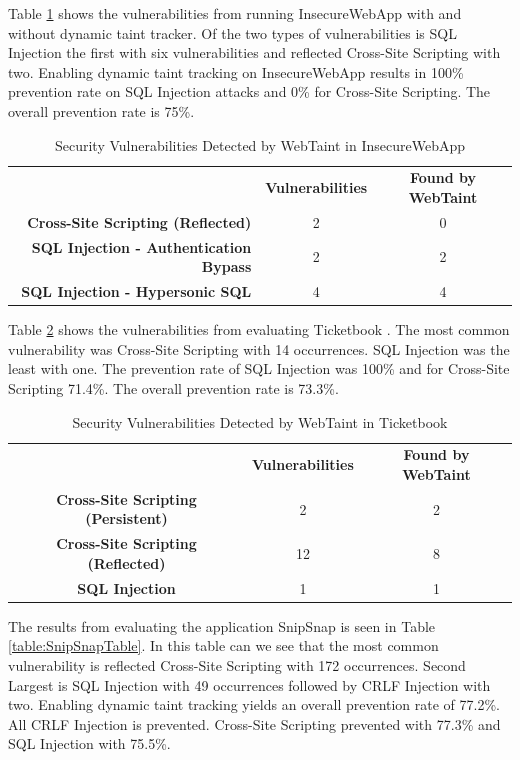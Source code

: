 Table \ref{table:InsecureTable} shows the vulnerabilities from running InsecureWebApp \parencite{insecure} with and without dynamic taint tracker. Of the two types of vulnerabilities is SQL Injection the first with six vulnerabilities and reflected Cross-Site Scripting with two. Enabling dynamic taint tracking on InsecureWebApp \parencite{insecure} results in 100\% prevention rate on SQL Injection attacks and 0\% for Cross-Site Scripting. The overall prevention rate is 75\%. 

\begin{table}[H]
  \centering
  \caption{Security Vulnerabilities Detected by WebTaint in InsecureWebApp}
  \label{table:InsecureTable}
    \begin{tabular}{rcc}
      & \textbf{Vulnerabilities} & \textbf{Found by WebTaint} \\
      \textbf{Cross-Site Scripting (Reflected)}      & 2             & 0  \\
      \textbf{SQL Injection - Authentication Bypass} & 2             & 2  \\
      \textbf{SQL Injection - Hypersonic SQL}        & 4             & 4  
    \end{tabular}
\end{table}

Table \ref{table:Ticketbook} shows the vulnerabilities from evaluating Ticketbook \parencite{ticketbook}. The most common vulnerability was Cross-Site Scripting with 14 occurrences. SQL Injection was the least with one. The prevention rate of SQL Injection was 100\% and for Cross-Site Scripting 71.4\%. The overall prevention rate is 73.3\%.

\begin{table}[H]
  \centering
  \caption{Security Vulnerabilities Detected by WebTaint in Ticketbook}
  \label{table:Ticketbook}
  \begin{tabular}{ccc}
    & \textbf{Vulnerabilities} & \textbf{Found by WebTaint} \\
    \textbf{Cross-Site Scripting (Persistent)} & 2             & 2 \\
    \textbf{Cross-Site Scripting (Reflected)}  & 12            & 8 \\
    \textbf{SQL Injection}                     & 1             & 1
  \end{tabular}
\end{table}

The results from evaluating the application SnipSnap \parencite{snipsnap} is seen in Table \ref{table:SnipSnapTable}. In this table can we see that the most common vulnerability is reflected Cross-Site Scripting with 172 occurrences. Second Largest is SQL Injection with 49 occurrences followed by CRLF Injection with two. Enabling dynamic taint tracking yields an overall prevention rate of 77.2\%. All CRLF Injection is prevented. Cross-Site Scripting prevented with 77.3\% and SQL Injection with 75.5\%.


